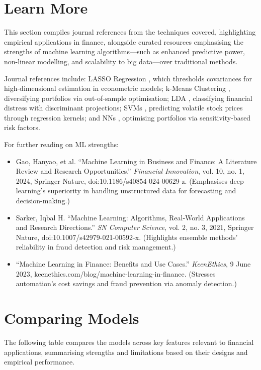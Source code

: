 \documentclass{article}
\begin{document}
\section{Learn More}

This section compiles journal references from the techniques covered, highlighting empirical applications in finance, alongside curated resources emphasising the strengths of machine learning algorithms—such as enhanced predictive power, non-linear modelling, and scalability to big data—over traditional methods.

Journal references include: LASSO Regression \cite{Fan2013}, which thresholds covariances for high-dimensional estimation in econometric models; k-Means Clustering \cite{LopezDePrado2016}, diversifying portfolios via out-of-sample optimisation; LDA \cite{Coats1994}, classifying financial distress with discriminant projections; SVMs \cite{Inan2018}, predicting volatile stock prices through regression kernels; and NNs \cite{Golosnoy2023}, optimising portfolios via sensitivity-based risk factors.

For further reading on ML strengths: 
\begin{itemize}
\item Gao, Hanyao, et al. ``Machine Learning in Business and Finance: A Literature Review and Research Opportunities.'' \textit{Financial Innovation}, vol. 10, no. 1, 2024, Springer Nature, doi:10.1186/s40854-024-00629-z. (Emphasises deep learning's superiority in handling unstructured data for forecasting and decision-making.)
\item Sarker, Iqbal H. ``Machine Learning: Algorithms, Real-World Applications and Research Directions.'' \textit{SN Computer Science}, vol. 2, no. 3, 2021, Springer Nature, doi:10.1007/s42979-021-00592-x. (Highlights ensemble methods' reliability in fraud detection and risk management.)
\item ``Machine Learning in Finance: Benefits and Use Cases.'' \textit{KeenEthics}, 9 June 2023, keenethics.com/blog/machine-learning-in-finance. (Stresses automation's cost savings and fraud prevention via anomaly detection.)
\end{itemize}






\section{Comparing Models}

The following table compares the models across key features relevant to financial applications, summarising strengths and limitations based on their designs and empirical performance.
\end{document}
